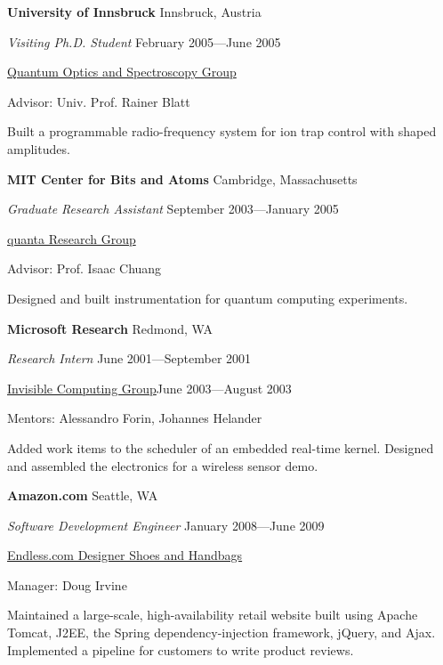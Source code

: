 \documentclass[letter]{article}
\begin{document}
\par

\vspace{\baselineskip}
\par
{\bf University of Innsbruck} \hfill Innsbruck, Austria
\par
{\em Visiting Ph.D. Student} \hfill February 2005---June 2005
\par
\href{http://heart-c704.uibk.ac.at/index.html}{Quantum Optics and Spectroscopy Group}
\par
Advisor: Univ. Prof. Rainer Blatt
\par
Built a programmable radio-frequency system for ion trap control with shaped amplitudes.
\par

\vspace{\baselineskip}
\par
{\bf MIT Center for Bits and Atoms} \hfill Cambridge, Massachusetts
\par
{\em Graduate Research Assistant} \hfill September 2003---January 2005
\par
\href{http://web.mit.edu/~cua/www/quanta/}{quanta Research Group}
\par
Advisor: Prof. Isaac Chuang
\par
Designed and built instrumentation for quantum computing experiments.
\par

\vspace{\baselineskip}
\par
{\bf Microsoft Research} \hfill Redmond, WA
\par
{\em Research Intern} \hfill June 2001---September 2001
\par
\href{http://research.microsoft.com/en-us/projects/mic/default.aspx}{Invisible Computing Group}\hfill June 2003---August 2003
\par
Mentors: Alessandro Forin, Johannes Helander
\par
Added work items to the scheduler of an embedded real-time kernel.
Designed and assembled the electronics for a wireless sensor demo.

\par

\vspace{\baselineskip}
\par
{\bf {Amazon.com}} \hfill Seattle, WA
\par
{\em Software Development Engineer} \hfill January 2008---June 2009
\par
\href{http://www.endless.com}{Endless.com Designer Shoes and Handbags}
\par
Manager: Doug Irvine
\par
Maintained a large-scale, high-availability
retail website built using Apache Tomcat, J2EE,
the Spring dependency-injection framework, jQuery, and Ajax. Implemented a
pipeline for customers to write product reviews.
\end{document}
